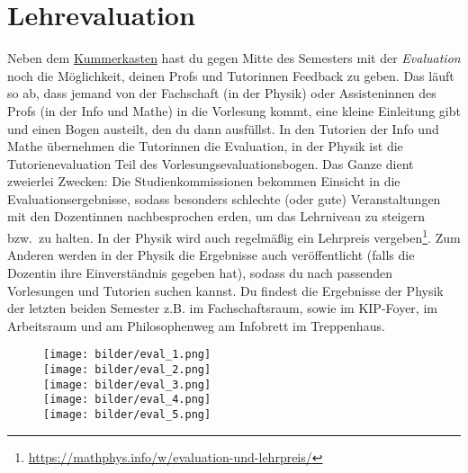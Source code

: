 \section{Lehrevaluation}
\label{eval}



\noindent Neben dem \hyperref[kummerkasten]{Kummerkasten} hast du gegen Mitte des Semesters mit der \emph{Evaluation} noch die Möglichkeit, deinen Profs und Tutorinnen Feedback zu geben. Das läuft so ab, dass jemand von der Fachschaft (in der Physik) oder Assisteninnen des Profs (in der Info und Mathe) in die Vorlesung kommt, eine kleine Einleitung gibt und einen Bogen austeilt, den du dann ausfüllst. In den Tutorien der Info und Mathe übernehmen die Tutorinnen die Evaluation, in der Physik ist die Tutorienevaluation Teil des Vorlesungsevaluationsbogen.
Das Ganze dient zweierlei Zwecken: Die Studienkommissionen bekommen Einsicht in die Evaluationsergebnisse, sodass besonders schlechte (oder gute) Veranstaltungen mit den Dozentinnen nachbesprochen erden, um das Lehrniveau zu steigern bzw.\ zu halten. In der Physik wird auch regelmäßig ein Lehrpreis vergeben\footnote{\url{https://mathphys.info/w/evaluation-und-lehrpreis/}}. Zum Anderen werden in der Physik die Ergebnisse auch veröffentlicht (falls die Dozentin ihre Einverständnis gegeben hat), sodass du nach passenden Vorlesungen und Tutorien suchen kannst. Du findest die Ergebnisse der Physik der letzten beiden Semester z.B. im Fachschaftsraum, sowie im \gls{KIP}-Foyer, im Arbeitsraum und am Philosophenweg am Infobrett im Treppenhaus.

\vspace{1cm}


\begin{figure}[h]
    \begin{center}
        \texttt{[image: bilder/eval\_1.png]}\\
        \texttt{[image: bilder/eval\_2.png]}\\
        \texttt{[image: bilder/eval\_3.png]}\\
        \texttt{[image: bilder/eval\_4.png]}\\
        \texttt{[image: bilder/eval\_5.png]}\\
    \end{center}
\end{figure}

\vfill
